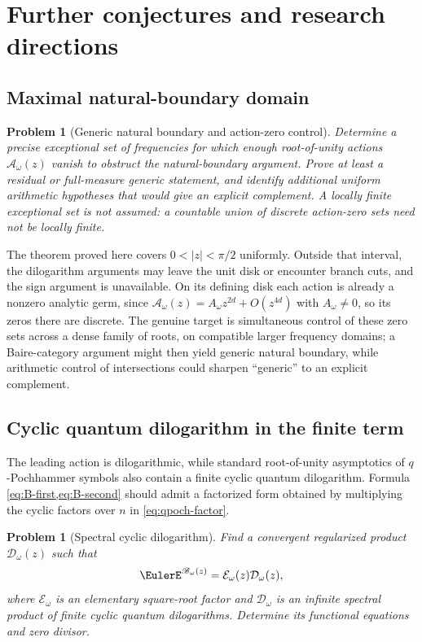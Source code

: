 \documentclass[11pt]{article}
\newtheorem{problem}[theorem]{Problem}
\theoremstyle{definition}
\begin{document}
\section{Further conjectures and research directions}

\subsection{Maximal natural-boundary domain}

\begin{problem}[Generic natural boundary and action-zero control]
Determine a precise exceptional set of frequencies for which enough
root-of-unity actions $\mathscr A_\omega(z)$ vanish to obstruct the
natural-boundary argument.  Prove at least a residual or full-measure generic
statement, and identify additional uniform arithmetic hypotheses that would
give an explicit complement.  A locally finite exceptional set is not assumed:
a countable union of discrete action-zero sets need not be locally finite.
\end{problem}

The theorem proved here covers $0<|z|<\pi/2$ uniformly.  Outside that interval,
the dilogarithm arguments may leave the unit disk or encounter branch cuts, and
the sign argument is unavailable.  On its defining disk each action is already
a nonzero analytic germ, since
\(
 \mathscr A_\omega(z)=A_\omega z^{2d}+O(z^{4d})
\)
with $A_\omega\ne0$, so its zeros there are discrete.  The genuine target is
simultaneous control of these zero sets across a dense family of roots, on
compatible larger frequency domains; a Baire-category argument might then
yield generic natural boundary, while arithmetic control of intersections
could sharpen ``generic'' to an explicit complement.

\subsection{Cyclic quantum dilogarithm in the finite term}

The leading action is dilogarithmic, while standard root-of-unity asymptotics of $q$-Pochhammer symbols also contain a finite cyclic quantum dilogarithm.  Formula \cref{eq:B-first,eq:B-second} should admit a factorized form obtained by multiplying the cyclic factors over $n$ in \cref{eq:qpoch-factor}.

\begin{problem}[Spectral cyclic dilogarithm]
Find a convergent regularized product $\mathcal D_\omega(z)$ such that
\[
 \EulerE^{\mathscr B_\omega(z)}
 =\mathcal E_\omega(z)\mathcal D_\omega(z),
\]
where $\mathcal E_\omega$ is an elementary square-root factor and $\mathcal D_\omega$ is an infinite spectral product of finite cyclic quantum dilogarithms.  Determine its functional equations and zero divisor.
\end{problem}
\end{document}
